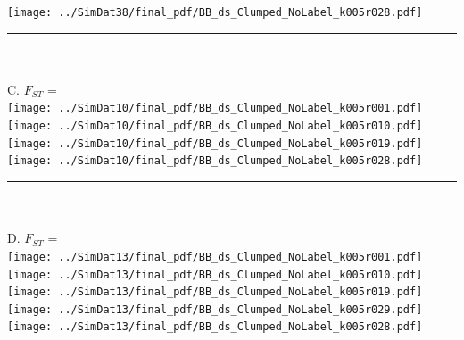 \documentclass[varwidth=true, border={80, 10}]{standalone}
\newlength{\nameraise}
\newlength{\nameoverhang}
\begin{document}
\texttt{[image: ../SimDat38/final\_pdf/BB\_ds\_Clumped\_NoLabel\_k005r028.pdf]}~\hspace*{-\nameoverhang}\raisebox{\nameraise}{FLOCK (9/9)} \\
\noindent\rule[.5cm]{8.2in}{0.4pt}\\
\vspace{-2.5em}\\
C. $F_{ST}$ = \\
\texttt{[image: ../SimDat10/final\_pdf/BB\_ds\_Clumped\_NoLabel\_k005r001.pdf]}~\hspace*{-\nameoverhang}\raisebox{\nameraise}{STRUCTURE A.C (9/9)} \\
\texttt{[image: ../SimDat10/final\_pdf/BB\_ds\_Clumped\_NoLabel\_k005r010.pdf]}~\hspace*{-\nameoverhang}\raisebox{\nameraise}{STRUCTURE NA.C (9/9)} \\
\texttt{[image: ../SimDat10/final\_pdf/BB\_ds\_Clumped\_NoLabel\_k005r019.pdf]}~\hspace*{-\nameoverhang}\raisebox{\nameraise}{STRUCTURE NA.NC  (9/9)} \\
\texttt{[image: ../SimDat10/final\_pdf/BB\_ds\_Clumped\_NoLabel\_k005r028.pdf]}~\hspace*{-\nameoverhang}\raisebox{\nameraise}{FLOCK (9/9)} \\
\noindent\rule[.5cm]{8.2in}{0.4pt}\\
\vspace{-2.5em}\\
D. $F_{ST}$ = \\
\texttt{[image: ../SimDat13/final\_pdf/BB\_ds\_Clumped\_NoLabel\_k005r001.pdf]}~\hspace*{-\nameoverhang}\raisebox{\nameraise}{STRUCTURE A.C (9/9)} \\
\texttt{[image: ../SimDat13/final\_pdf/BB\_ds\_Clumped\_NoLabel\_k005r010.pdf]}~\hspace*{-\nameoverhang}\raisebox{\nameraise}{STRUCTURE NA.C (9/9)} \\
\texttt{[image: ../SimDat13/final\_pdf/BB\_ds\_Clumped\_NoLabel\_k005r019.pdf]}~\hspace*{-\nameoverhang}\raisebox{\nameraise}{STRUCTURE NA.NC  (9/9)} \\
\texttt{[image: ../SimDat13/final\_pdf/BB\_ds\_Clumped\_NoLabel\_k005r029.pdf]}~\hspace*{-\nameoverhang}\raisebox{\nameraise}{FLOCK (9/9)} \\
\texttt{[image: ../SimDat13/final\_pdf/BB\_ds\_Clumped\_NoLabel\_k005r028.pdf]}~\hspace*{-\nameoverhang}\raisebox{\nameraise}{FLOCK (1/9)} \\
\end{document}
